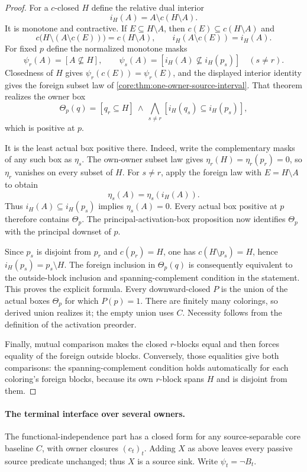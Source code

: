 \begin{proof}
For a $c$-closed $H$ define the relative dual interior
\[
 i_H(A)=A\setminus c(H\setminus A).
\]
It is monotone and contractive. If $E\subseteq H\setminus A$, then
$c(E)\subseteq c(H\setminus A)$ and
\[
 c\bigl(H\setminus(A\setminus c(E))\bigr)=c(H\setminus A),
 \qquad i_H(A\setminus c(E))=i_H(A).
\]
For fixed $p$ define the normalized monotone masks
\[
 \psi_r(A)=[A\not\subseteq H],\qquad
 \psi_s(A)=[i_H(A)\not\subseteq i_H(p_s)]\quad(s\ne r).
\]
Closedness of $H$ gives $\psi_r(c(E))=\psi_r(E)$, and the displayed
interior identity gives the foreign subset law of
\cref{core:thm:one-owner-source-interval}. That theorem realizes the
owner box
\[
 \Theta_p(q)=[q_r\subseteq H]\ \wedge\
       \bigwedge_{s\ne r}[i_H(q_s)\subseteq i_H(p_s)],
\]
which is positive at $p$.

It is the least actual box positive there. Indeed, write the
complementary masks of any such box as $\eta_s$.
The own-owner subset law gives $\eta_r(H)=\eta_r(p_r)=0$,
so $\eta_r$ vanishes on every subset of $H$.
For $s\ne r$, apply the foreign law with $E=H\setminus A$ to obtain
\[
 \eta_s(A)=\eta_s(i_H(A)).
\]
Thus $i_H(A)\subseteq i_H(p_s)$ implies $\eta_s(A)=0$.
Every actual box positive at $p$ therefore contains $\Theta_p$.
The principal-activation-box proposition now identifies
$\Theta_p$ with the principal downset of $p$.

Since $p_s$ is disjoint from $p_r$ and $c(p_r)=H$, one has
$c(H\setminus p_s)=H$, hence $i_H(p_s)=p_s\setminus H$.
The foreign inclusion in $\Theta_p(q)$ is consequently equivalent
to the outside-block inclusion and spanning-complement condition in
the statement. This proves the explicit formula.
Every downward-closed $P$ is the union of the actual boxes
$\Theta_p$ for which $P(p)=1$. There are finitely many colorings,
so derived union realizes it; the empty union uses $C$.
Necessity follows from the definition of the activation preorder.

Finally, mutual comparison makes the closed $r$-blocks equal and then
forces equality of the foreign outside blocks. Conversely, those
equalities give both comparisons: the spanning-complement condition
holds automatically for each coloring's foreign blocks, because its
own $r$-block spans $H$ and is disjoint from them.
\end{proof}

\paragraph{The terminal interface over several owners.}
The functional-independence part has a closed form for any
source-separable core baseline $C$, with owner closures $(c_t)_t$.
Adding $X$ as above leaves every passive source predicate unchanged;
thus $X$ is a source sink. Write $\psi_t=\neg B_t$.

